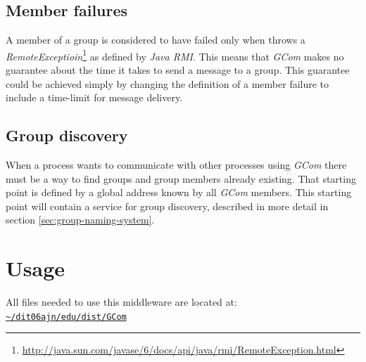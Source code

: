 \documentclass[titlepage, twocolumn, a4paper, 10pt]{article}
\def\pathtocode{\url{~/dit06ajn/edu/dist/GCom}}
\begin{document}

\subsection{Member failures}\label{sec:member-failures}
A member of a group is considered to have failed only when throws a
\textit{RemoteExceptioin}\footnote{\url{http://java.sun.com/javase/6/docs/api/java/rmi/RemoteException.html}}
as defined by \textit{Java RMI}. This means that \textit{GCom} makes
no guarantee about the time it takes to send a message to a group.
This guarantee could be achieved simply by changing the definition of
a member failure to include a time-limit for message delivery.

\subsection{Group discovery}\label{sec:group-discovery}
When a process wants to communicate with other processes using
\textit{GCom} there must be a way to find groups and group members
already existing. That starting point is defined by a global address
known by all \textit{GCom} members. This starting point will contain a
service for group discovery, described in more detail in section
\ref{sec:group-naming-system}.


\section{Usage}\label{sec:usage}
All files needed to use this middleware are located at:\\
\texttt{\pathtocode}
\end{document}
